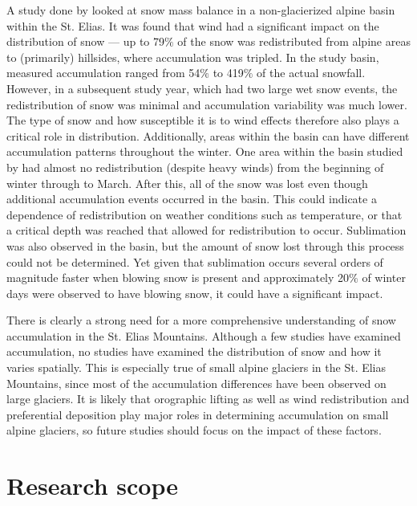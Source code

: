 \documentclass{sfuthesis}
\begin{document}
A study done by \cite{Pomeroy1999} looked at snow mass balance in a non-glacierized alpine basin within the St. Elias. It was found that wind had a significant impact on the distribution of snow --- up to 79$\%$ of the snow was redistributed from alpine areas to (primarily) hillsides, where accumulation was tripled. In the study basin, measured accumulation ranged from 54$\%$ to 419$\%$ of the actual snowfall. However, in a subsequent study year, which had two large wet snow events, the redistribution of snow was minimal and accumulation variability was much lower. The type of snow and how susceptible it is to wind effects therefore also plays a critical role in distribution. Additionally, areas within the basin can have different accumulation patterns throughout the winter. One area within the basin studied by \cite{Pomeroy1999} had almost no redistribution (despite heavy winds) from the beginning of winter through to March. After this, all of the snow was lost even though additional accumulation events occurred in the basin. This could indicate a dependence of redistribution on weather conditions such as temperature, or that a critical depth was reached that allowed for redistribution to occur. Sublimation was also observed in the basin, but the amount of snow lost through this process could not be determined. Yet given that sublimation occurs several orders of magnitude faster when blowing snow is present and approximately 20$\%$ of winter days were observed to have blowing snow, it could have a significant impact.

There is clearly a strong need for a more comprehensive understanding of snow accumulation in the St. Elias Mountains. Although a few studies have examined accumulation, no studies have examined the distribution of snow and how it varies spatially. This is especially true of small alpine glaciers in the St. Elias Mountains, since most of the accumulation differences have been observed on large glaciers. It is likely that orographic lifting as well as wind redistribution and preferential deposition play major roles in determining accumulation on small alpine glaciers, so future studies should focus on the impact of these factors. 

\section{Research scope}
\end{document}
